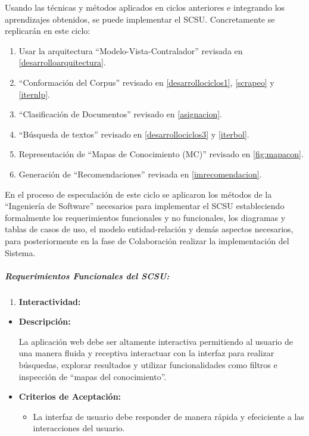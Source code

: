 \documentclass[
  12pt,
  openany]{book}
\providecommand{\tightlist}{%
  \setlength{\itemsep}{0pt}\setlength{\parskip}{0pt}}
\begin{document}
Usando las técnicas y métodos aplicados en ciclos anteriores e integrando los aprendizajes obtenidos, se puede implementar el SCSU. Concretamente se replicarán en este ciclo:

\begin{enumerate}
\def\labelenumi{\arabic{enumi}.}
\item
  Usar la arquitectura ``Modelo-Vista-Contralador'' revisada en \ref{desarrolloarquitectura}.
\item
  ``Conformación del Corpus'' revisado en \ref{desarrollociclos1}, \ref{scrapeo} y \ref{iternlp}.
\item
  ``Clasificación de Documentos'' revisado en \ref{asignacion}.
\item
  ``Búsqueda de textos'' revisado en \ref{desarrollociclos3} y \ref{iterbol}.
\item
  Representación de ``Mapas de Conocimiento (MC)'' revisado en \ref{fig:mapacon}.
\item
  Generación de ``Recomendaciones'' revisada en \ref{imrecomendacion}.
\end{enumerate}

En el proceso de especulación de este ciclo se aplicaron los métodos de la ``Ingeniería de Software'' necesarios para implementar el SCSU estableciendo formalmente los requerimientos funcionales y no funcionales, los diagramas y tablas de casos de uso, el modelo entidad-relación y demás aspectos necesarios, para posteriormente en la fase de Colaboración realizar la implementación del Sistema.

\hypertarget{requerimientos-funcionales-del-scsu}{%
\subparagraph{\texorpdfstring{\textbf{Requerimientos Funcionales del SCSU:}}{Requerimientos Funcionales del SCSU:}}\label{requerimientos-funcionales-del-scsu}}

\begin{enumerate}
\def\labelenumi{\arabic{enumi}.}
\tightlist
\item
  \textbf{Interactividad:}
\end{enumerate}

\begin{itemize}
\item
  \textbf{Descripción:}

  La aplicación web debe ser altamente interactiva permitiendo al usuario de una manera fluida y receptiva interactuar con la interfaz para realizar búsquedas, explorar resultados y utilizar funcionalidades como filtros e inspección de ``mapas del conocimiento''.
\item
  \textbf{Criterios de Aceptación:}

  \begin{itemize}
  \tightlist
  \item
    La interfaz de usuario debe responder de manera rápida y efeciciente a las interacciones del usuario.
  \end{itemize}
\end{itemize}
\end{document}
